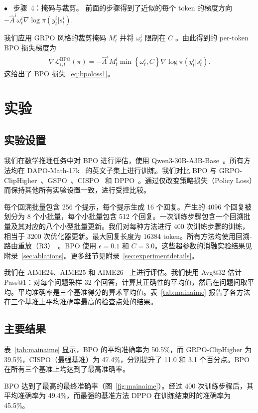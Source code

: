 \documentclass[11pt]{article}
\theoremstyle{definition}
\def\eq#1{\begin{equation*}\begin{split}#1\end{split}\end{equation*}}
\def\dr#1{\left\{#1\right\}}
\def\calL{\mathcal{L}}
\newcommand\na{\nabla}
\newcommand\wt{\omega}
\newcommand\adv{\hat{A}}
\begin{document}
\noindent$\bullet$ ~步骤~4：掩码与裁剪。  
前面的步骤得到了近似的每个 token 的梯度方向 $-\adv^i\wt_t^i\na\log\pi(y_t^i | s_t^i).$ 

我们应用 GRPO 风格的裁剪掩码 $M_t^i$ 并将 $\wt_t^i$ 限制在 $C$ 。由此得到的 per-token BPO 损失梯度为
\eq{
    \na \calL_{i,t}^{\mathrm{BPO}}(\pi) = -\adv^i M_t^i\min\dr{{\wt_t^i}, C}\na \log\pi(y_t^i | s_t^i).  
}
这给出了 BPO 损失~\eqref{eq:bpoloss1}。

\section{实验}\label{sec:experiments}

\subsection{实验设置}
我们在数学推理任务中对 BPO 进行评估，使用 Qwen3-30B-A3B-Base~\cite{yang2025qwen3}。所有方法均在 DAPO-Math-17k~\cite{yu2026dapo} 的英文子集上进行训练。我们对比 BPO 与 GRPO-ClipHigher~\cite{shao2024deepseekmath,yu2026dapo}、GSPO~\cite{zheng2025gspo}、CISPO~\cite{chen2025minimax} 和 DPPO~\cite{qi2026rethinking}。通过仅改变策略损失（Policy Loss）而保持其他所有实验设置一致，进行受控比较。 

每个回溯批量包含 256 个提示，每个提示生成 16 个回复。产生的 4096 个回复被划分为 8 个小批量，每个小批量包含 512 个回复。一次训练步骤包含一个回溯批量及其对应的八个小型批量更新。我们对每种方法进行 400 次训练步骤的训练，相当于 3200 次优化器更新。最大回复长度为 16384 token。所有方法均使用回溯-路由重放（R3）~\cite{ma2025stabilizing}。BPO 使用 $\epsilon=0.1$ 和 $C=3.0$。这些超参数的消融实验结果见附录~\ref{sec:ablations}。更多细节见附录~\ref{sec:experimentdetails}。

我们在 AIME24、AIME25 和 AIME26~\cite{aimeproblems} 上进行评估。我们使用 Avg@32 估计 Pass@1：对每个问题采样 32 个回答，计算其正确性的平均值，然后在问题间取平均。平均准确率是三个基准得分的算术平均值。表~\ref{tab:mainaime} 报告了各方法在三个基准上平均准确率最高的检查点处的结果。 

\subsection{主要结果}
表~\ref{tab:mainaime} 显示，BPO 的平均准确率为 50.5\%，而 GRPO-ClipHigher 为 39.5\%，CISPO（最强基准）为 47.4\%，分别提升了 11.0 和 3.1 个百分点。BPO 在所有三个基准上均达到了最高准确率。

BPO 达到了最高的最终准确率（图~\ref{fig:mainaime}）。经过 400 次训练步骤后，其平均准确率为 49.4\%，而最强的基准方法 DPPO 在训练结束时的准确率为 45.5\%。
\end{document}
